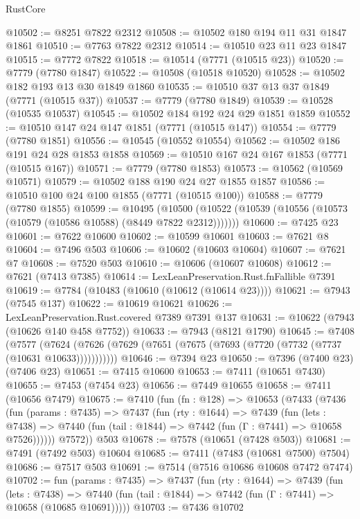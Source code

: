 \begin{lexlean}{RustCore}
\begin{coremodule}
@10502 := @8251 @7822 @2312
@10508 := @10502 @180 @194 @11 @31 @1847 @1861
@10510 := @7763 @7822 @2312
@10514 := @10510 @23 @11 @23 @1847
@10515 := @7772 @7822
@10518 := @10514 (@7771 (@10515 @23))
@10520 := @7779 (@7780 @1847)
@10522 := @10508 (@10518 @10520)
@10528 := @10502 @182 @193 @13 @30 @1849 @1860
@10535 := @10510 @37 @13 @37 @1849 (@7771 (@10515 @37))
@10537 := @7779 (@7780 @1849)
@10539 := @10528 (@10535 @10537)
@10545 := @10502 @184 @192 @24 @29 @1851 @1859
@10552 := @10510 @147 @24 @147 @1851 (@7771 (@10515 @147))
@10554 := @7779 (@7780 @1851)
@10556 := @10545 (@10552 @10554)
@10562 := @10502 @186 @191 @24 @28 @1853 @1858
@10569 := @10510 @167 @24 @167 @1853 (@7771 (@10515 @167))
@10571 := @7779 (@7780 @1853)
@10573 := @10562 (@10569 @10571)
@10579 := @10502 @188 @190 @24 @27 @1855 @1857
@10586 := @10510 @100 @24 @100 @1855 (@7771 (@10515 @100))
@10588 := @7779 (@7780 @1855)
@10599 := @10495
    (@10500 (@10522 (@10539 (@10556 (@10573 (@10579 (@10586 @10588) (@8449 @7822 @2312)))))))
@10600 := @7425 @23
@10601 := @7622 @10600
@10602 := @10599 @10601
@10603 := @7621 @8
@10604 := @7496 @503
@10606 := @10602 (@10603 @10604)
@10607 := @7621 @7
@10608 := @7520 @503
@10610 := @10606 (@10607 @10608)
@10612 := @7621 (@7413 @7385)
@10614 := LexLeanPreservation.Rust.fnFallible @7391
@10619 := @7784 (@10483 (@10610 (@10612 (@10614 @23))))
@10621 := @7943 (@7545 @137)
@10622 := @10619 @10621
@10626 := LexLeanPreservation.Rust.covered @7389 @7391 @137
@10631 := @10622 (@7943 (@10626 @140 @458 @7752))
@10633 := @7943 (@8121 @1790)
@10645 := @7408
    (@7577 (@7624 (@7626 (@7629 (@7651 (@7675 (@7693 (@7720 (@7732 (@7737 (@10631 @10633)))))))))))
@10646 := @7394 @23
@10650 := @7396 (@7400 @23) (@7406 @23)
@10651 := @7415 @10600
@10653 := @7411 (@10651 @7430)
@10655 := @7453 (@7454 @23)
@10656 := @7449 @10655
@10658 := @7411 (@10656 @7479)
@10675 := @7410
    (fun (fn : @128) =>
    @10653
      (@7433
        (@7436
          (fun (params : @7435) =>
          @7437
            (fun (rty : @1644) =>
            @7439
              (fun (lets : @7438) =>
              @7440 (fun (tail : @1844) => @7442 (fun (Γ : @7441) => @10658 @7526))))))
        @7572))
    @503
@10678 := @7578 (@10651 (@7428 @503))
@10681 := @7491 (@7492 @503) @10604
@10685 := @7411 (@7483 (@10681 @7500) @7504)
@10686 := @7517 @503
@10691 := @7514 (@7516 @10686 @10608 @7472 @7474)
@10702 := fun (params : @7435) =>
  @7437
    (fun (rty : @1644) =>
    @7439
      (fun (lets : @7438) =>
      @7440 (fun (tail : @1844) => @7442 (fun (Γ : @7441) => @10658 (@10685 @10691)))))
@10703 := @7436 @10702

\end{coremodule}
\end{lexlean}
